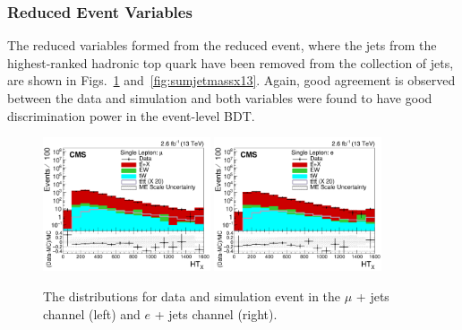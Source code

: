 \subsubsection*{Reduced Event Variables}
The reduced variables formed from the reduced event, where the jets from the highest-ranked hadronic top quark have been removed from the collection of jets, are shown in Figs.~\ref{fig:htx13} and~\ref{fig:sumjetmassx13}. Again, good agreement is observed between the data and simulation and both variables were found to have good discrimination power in the event-level BDT.

\begin{figure}[ht!]
    \includegraphics[width=0.44\textwidth]{images/Run2/HTX_StackLogY.pdf}
    \includegraphics[width=0.44\textwidth]{images/Run2/HTX_StackLogY_e.pdf}
    \caption{ The \HTX distributions for data and simulation event in the $\mu$ + jets channel (left) and $e$ + jets channel (right).}
    \label{fig:htx13}
\end{figure}

